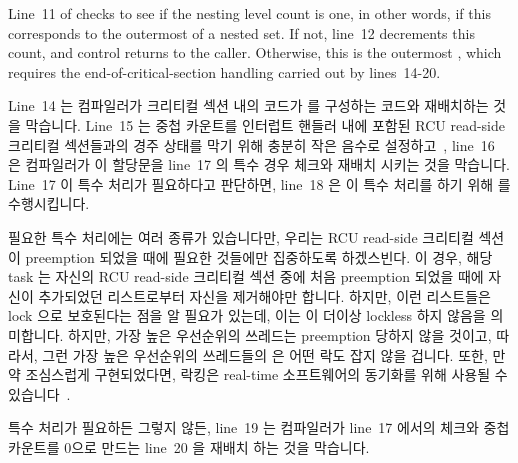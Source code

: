 Line~11 of  checks to see if the nesting level count
is one, in other words, if this corresponds to the outermost
 of a nested set.
If not, line~12 decrements this count, and control returns to the caller.
Otherwise, this is the outermost , which requires
the end-of-critical-section handling carried out by lines~14-20.
\fi

Line~14 는 컴파일러가 크리티컬 섹션 내의 코드가  를
구성하는 코드와 재배치하는 것을 막습니다.
Line~15 는 중첩 카운트를 인터럽트 핸들러 내에 포함된 RCU read-side 크리티컬
섹션들과의 경주 상태를 막기 위해 충분히 작은 음수로
설정하고~\cite{PaulEMcKenney2011RCU3.0trainwreck}, line~16 은 컴파일러가 이
할당문을 line~17 의 특수 경우 체크와 재배치 시키는 것을 막습니다.
Line~17 이 특수 처리가 필요하다고 판단하면, line~18 은 이 특수 처리를 하기 위해
 를 수행시킵니다.

필요한 특수 처리에는 여러 종류가 있습니다만, 우리는 RCU read-side 크리티컬
섹션이 preemption 되었을 때에 필요한 것들에만 집중하도록 하겠스빈다.
이 경우, 해당 task 는 자신의 RCU read-side 크리티컬 섹션 중에 처음 preemption
되었을 때에 자신이 추가되었던 리스트로부터 자신을 제거해야만 합니다.
하지만, 이런 리스트들은 lock 으로 보호된다는 점을 알 필요가 있는데, 이는
 이 더이상 lockless 하지 않음을 의미합니다.
하지만, 가장 높은 우선순위의 쓰레드는 preemption 당하지 않을 것이고, 따라서,
그런 가장 높은 우선순위의 쓰레드들의  은 어떤 락도 잡지
않을 겁니다.
또한, 만약 조심스럽게 구현되었다면, 락킹은 real-time 소프트웨어의 동기화를 위해
사용될 수 있습니다~\cite{BjoernBrandenburgPhD}.

특수 처리가 필요하든 그렇지 않든, line~19 는 컴파일러가 line~17 에서의 체크와
중첩 카운트를 0으로 만드는 line~20 을 재배치 하는 것을 막습니다.
\iffalse

